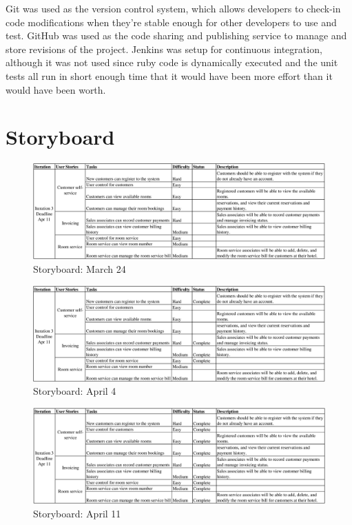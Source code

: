 \documentclass[12pt]{elsarticle}
\begin{document}
Git was used as the version control system, which allows developers to check-in code modifications when they're stable enough for other developers to use and test. GitHub was used as the code sharing and publishing service to manage and store revisions of the project. Jenkins was setup for continuous integration, although it was not used since ruby code is dynamically executed and the unit tests all run in short enough time that it would have been more effort than it would have been worth.
\section{Storyboard}

\begin{figure}[!ht]
	\centering
	\includegraphics[scale=0.18]{images/storyboard_mar24}
	\caption{Storyboard: March 24}
\end{figure}

\begin{figure}[!ht]
	\centering
	\includegraphics[scale=0.18]{images/storyboard_apr4}
	\caption{Storyboard: April 4}
\end{figure}

\begin{figure}[!ht]
	\centering
	\includegraphics[scale=0.18]{images/storyboard_apr11}
	\caption{Storyboard: April 11}
\end{figure}
\end{document}
